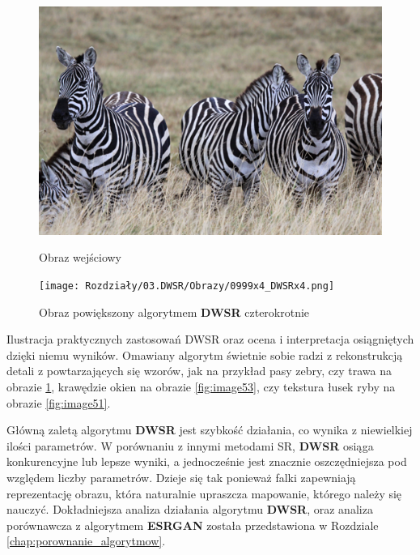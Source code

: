 \begin{figure}[ht]
    \centering
    \begin{minipage}[t]{0.45\linewidth}
        \includegraphics[width=\linewidth]{Rozdziały/03.DWSR/Obrazy/0999x4.png}
        \caption{Obraz wejściowy}
        \label{fig:image54}
    \end{minipage}
    \hspace{0.5cm}
    \begin{minipage}[t]{0.45\linewidth}
        \texttt{[image: Rozdziały/03.DWSR/Obrazy/0999x4\_DWSRx4.png]}
        \caption{Obraz powiększony algorytmem \textbf{DWSR} czterokrotnie}
        \label{fig:image55}
    \end{minipage}
\end{figure}

Ilustracja praktycznych zastosowań DWSR oraz ocena i interpretacja osiągniętych dzięki niemu wyników.
Omawiany algorytm świetnie sobie radzi z rekonstrukcją detali z powtarzających się wzorów, jak na przykład pasy zebry, czy trawa na obrazie \ref{fig:image55}, krawędzie okien na obrazie \ref{fig:image53}, czy tekstura łusek ryby na obrazie \ref{fig:image51}.


Główną zaletą algorytmu \textbf{DWSR} jest szybkość działania, co wynika z niewielkiej ilości parametrów. W porównaniu z innymi metodami SR, \textbf{DWSR} osiąga konkurencyjne lub lepsze wyniki, a jednocześnie jest znacznie oszczędniejsza pod względem liczby parametrów. Dzieje się tak ponieważ falki zapewniają reprezentację obrazu, która naturalnie upraszcza mapowanie, którego należy się nauczyć. 
Dokładniejsza analiza działania algorytmu \textbf{DWSR}, oraz analiza porównawcza z algorytmem \textbf{ESRGAN} została przedstawiona w Rozdziale \ref{chap:porownanie_algorytmow}.